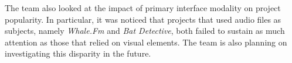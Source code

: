 \documentclass{sigchi}
\begin{document}

The team also looked at the impact of primary interface modality on project popularity.  In particular, it was noticed that projects that used audio files as subjects, namely \emph{Whale.Fm} and \emph{Bat Detective}, both failed to sustain as much attention as those that relied on visual elements.  The team is also planning on investigating this disparity in the future.






\end{document}
